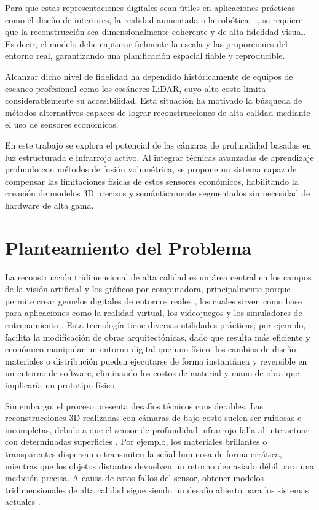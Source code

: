 \documentclass[12pt, a4, twoside, openany]{report}
\begin{document}
Para que estas representaciones digitales sean útiles en aplicaciones prácticas ---como el diseño de interiores, la realidad aumentada o la robótica---, se requiere que la reconstrucción sea dimensionalmente coherente y de alta fidelidad visual. Es decir, el modelo debe capturar fielmente la escala y las proporciones del entorno real, garantizando una planificación espacial fiable y reproducible.

Alcanzar dicho nivel de fidelidad ha dependido históricamente de equipos de escaneo profesional como los escáneres LiDAR, cuyo alto costo limita considerablemente su accesibilidad. Esta situación ha motivado la búsqueda de métodos alternativos capaces de lograr reconstrucciones de alta calidad mediante el uso de sensores económicos.

En este trabajo se explora el potencial de las cámaras de profundidad basadas en luz estructurada e infrarrojo activo. Al integrar técnicas avanzadas de aprendizaje profundo con métodos de fusión volumétrica, se propone un sistema capaz de compensar las limitaciones físicas de estos sensores económicos, habilitando la creación de modelos 3D precisos y semánticamente segmentados sin necesidad de hardware de alta gama.


\section{Planteamiento del Problema}

La reconstrucción tridimensional de alta calidad es un área central en los campos de la visión artificial y los gráficos por computadora, principalmente porque permite crear gemelos digitales de entornos reales \cite{fuller2020digital}, los cuales sirven como base para aplicaciones como la realidad virtual, los videojuegos y los simuladores de entrenamiento \cite{technologies12030040,zhang2015real}. Esta tecnología tiene diversas utilidades prácticas; por ejemplo, facilita la modificación de obras arquitectónicas, dado que resulta más eficiente y económico manipular un entorno digital que uno físico: los cambios de diseño, materiales o distribución pueden ejecutarse de forma instantánea y reversible en un entorno de software, eliminando los costos de material y mano de obra que implicaría un prototipo físico.

Sin embargo, el proceso presenta desafíos técnicos considerables. Las reconstrucciones 3D realizadas con cámaras de bajo costo suelen ser ruidosas e incompletas, debido a que el sensor de profundidad infrarrojo falla al interactuar con determinadas superficies \cite{afzal2025improving}. Por ejemplo, los materiales brillantes o transparentes dispersan o transmiten la señal luminosa de forma errática, mientras que los objetos distantes devuelven un retorno demasiado débil para una medición precisa. A causa de estos fallos del sensor, obtener modelos tridimensionales de alta calidad sigue siendo un desafío abierto para los sistemas actuales \cite{6594910}.
\end{document}
